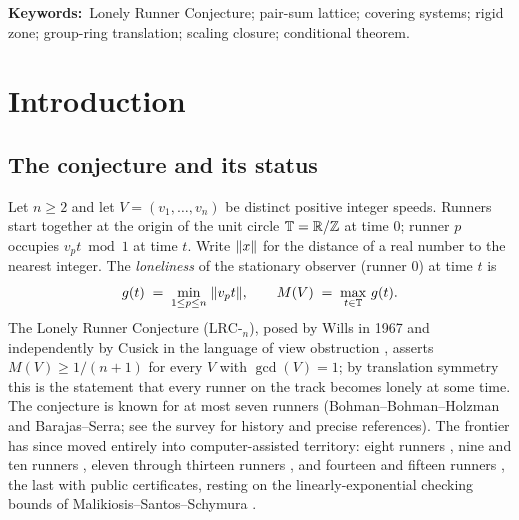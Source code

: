 \begin{abstract}
type, verified statement-by-statement: every proved result is a closure,
invariance, exhaustiveness, or machine-verification statement, while
every remaining obligation is a uniform growth-in-$k$ margin---a type no
result of this paper proves. The one instrument shaped to produce
that type, a transfer-matrix model of the strand census, closes by
theorem \emph{in its single-anchor scope}: its constrained transfer
matrices are partial permutations of spectral radius exactly $0$ or $1$,
and the missing margin is provably external to that lossless dynamics.
This is a structural paper: it does not solve or reduce the Lonely Runner
Conjecture, proves no new cases of it, and claims nothing beyond the
verified ranges stated; the three open hypotheses are not silently
established anywhere.
\end{abstract}

\noindent\textbf{Keywords:}\ Lonely Runner Conjecture; pair-sum lattice;
covering systems; rigid zone; group-ring translation; scaling closure;
conditional theorem.

\section{Introduction}\label{sec:intro}

\subsection{The conjecture and its status}

Let $n\ge 2$ and let $V=(v_1,\dots,v_n)$ be distinct positive integer
speeds. Runners start together at the origin of the unit circle
$\mathbb{T}=\mathbb{R}/\mathbb{Z}$ at time $0$; runner $p$ occupies $v_p t \bmod 1$ at time $t$.
Write $\lVert x \rVert$ for the distance of a real number to the nearest integer.
The \emph{loneliness} of the stationary observer (runner $0$) at time $t$
is
\[
g(t)\;=\;\min_{1\le p\le n}\;\lVert v_p t \rVert,
\qquad
M(V)\;=\;\max_{t\in\mathbb{T}}\,g(t).
\]
The Lonely Runner Conjecture ($\mathrm{LRC}$-$_n$), posed by Wills in 1967
and independently by Cusick in the language of view obstruction
\cite{PS-survey,Wills,Cusick1973}, asserts $M(V)\ge 1/(n{+}1)$ for every $V$ with
$\gcd(V)=1$; by translation symmetry this is the statement that every
runner on the track becomes lonely at some time. The conjecture is known
for at most seven runners (Bohman--Bohman--Holzman and
Barajas--Serra; see the survey \cite{PS-survey} for history and precise
references). The frontier has since moved entirely into computer-assisted
territory: eight runners \cite{Rosenfeld8}, nine and ten runners
\cite{Trakulthongchai}, eleven through thirteen runners
\cite{Sungkawichai}, and fourteen and fifteen runners \cite{Allikvere},
the last with public certificates, resting on the linearly-exponential
checking bounds of Malikiosis--Santos--Schymura \cite{MSS}.

